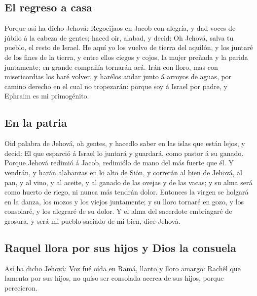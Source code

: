 \hypertarget{el-regreso-a-casa}{%
\subsection{El regreso a casa}\label{el-regreso-a-casa}}

 Porque así ha dicho Jehová: Regocijaos en Jacob con
alegría, y dad voces de júbilo á la cabeza de gentes; haced oir, alabad,
y decid: Oh Jehová, salva tu pueblo, el resto de Israel. 
He aquí yo los vuelvo de tierra del aquilón, y los juntaré de los fines
de la tierra, y entre ellos ciegos y cojos, la mujer preñada y la parida
juntamente; en grande compañía tornarán acá.  Irán con
lloro, mas con misericordias los haré volver, y harélos andar junto á
arroyos de aguas, por camino derecho en el cual no tropezarán: porque
soy á Israel por padre, y Ephraim es mi primogénito.

\hypertarget{en-la-patria}{%
\subsection{En la patria}\label{en-la-patria}}

 Oid palabra de Jehová, oh gentes, y hacedlo saber en las
islas que están lejos, y decid: El que esparció á Israel lo juntará y
guardará, como pastor á su ganado.  Porque Jehová redimió
á Jacob, redimiólo de mano del más fuerte que él.  Y
vendrán, y harán alabanzas en lo alto de Sión, y correrán al bien de
Jehová, al pan, y al vino, y al aceite, y al ganado de las ovejas y de
las vacas; y su alma será como huerto de riego, ni nunca más tendrán
dolor.  Entonces la virgen se holgará en la danza, los
mozos y los viejos juntamente; y su lloro tornaré en gozo, y los
consolaré, y los alegraré de su dolor.  Y el alma del
sacerdote embriagaré de grosura, y será mi pueblo saciado de mi bien,
dice Jehová.

\hypertarget{raquel-llora-por-sus-hijos-y-dios-la-consuela}{%
\subsection{Raquel llora por sus hijos y Dios la
consuela}\label{raquel-llora-por-sus-hijos-y-dios-la-consuela}}

 Así ha dicho Jehová: Voz fué oída en Ramá, llanto y
lloro amargo: Rachêl que lamenta por sus hijos, no quiso ser consolada
acerca de sus hijos, porque perecieron.

